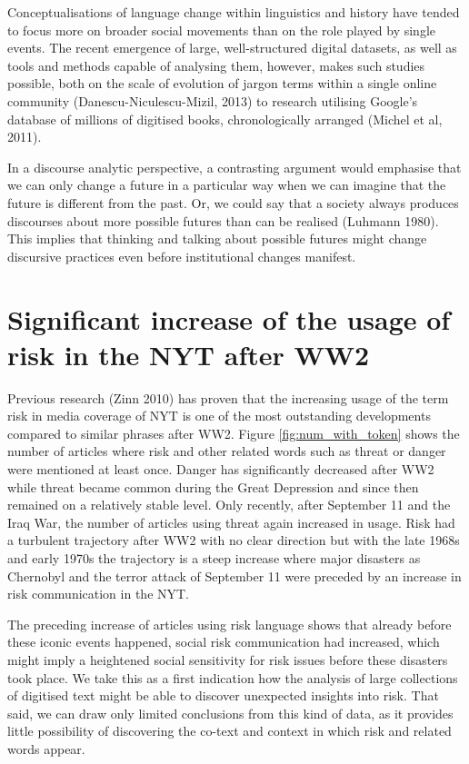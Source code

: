 Conceptualisations of language change within linguistics and history have tended to focus more on broader social movements than on the role played by single events. The recent emergence of large, well-structured digital datasets, as well as tools and methods capable of analysing them, however, makes such studies possible, both on the scale of evolution of jargon terms within a single online community (Danescu-Niculescu-Mizil, 2013) to research utilising Google's database of millions of digitised books, chronologically arranged (Michel et al, 2011).

In a discourse analytic perspective, a contrasting argument would emphasise that we can only change a future in a particular way when we can imagine that the future is different from the past. Or, we could say that a society always produces discourses about more possible futures than can be realised (Luhmann 1980). This implies that thinking and talking about possible futures might change discursive practices even before institutional changes manifest.

\section{Significant increase of the usage of risk in the NYT after WW2}

Previous research (Zinn 2010) has proven that the increasing usage of the term risk in media coverage of NYT is one of the most outstanding developments compared to similar phrases after WW2. Figure \ref{fig:num_with_token} shows the number of articles where risk and other related words such as threat or danger were mentioned at least once. Danger has significantly decreased after WW2 while threat became common during the Great Depression and since then remained on a relatively stable level. Only recently, after September 11 and the Iraq War, the number of articles using threat again increased in usage. Risk had a turbulent trajectory after WW2 with no clear direction but with the late 1968s and early 1970s the trajectory is a steep increase where major disasters as Chernobyl and the terror attack of September 11 were preceded by an increase in risk communication in the NYT.

The preceding increase of articles using risk language shows that already before these iconic events happened, social risk communication had increased, which might imply a heightened social sensitivity for risk issues before these disasters took place. We take this as a first indication how the analysis of large collections of digitised text might be able to discover unexpected insights into risk. That said, we can draw only limited conclusions from this kind of data, as it provides little possibility of discovering the co-text and context in which risk and related words appear.

